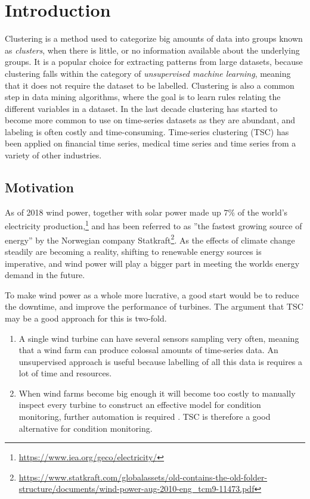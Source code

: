 \chapter{Introduction} \label{chap:intro}

Clustering is a method used to categorize big amounts of data into groups known as \textit{clusters}, when there is little, or no information available about the underlying groups. 
It is a popular choice for extracting patterns from large datasets, because clustering falls within the category of \textit{unsupervised machine learning}, meaning that it does not require the dataset to be labelled. 
Clustering is also a common step in data mining algorithms, where the goal is to learn rules relating the different variables in a dataset. 
In the last decade clustering has started to become more common to use on time-series datasets as they are abundant, and labeling is often costly and time-consuming. 
Time-series clustering (TSC) has been applied on financial time series, medical time series and time series from a variety of other industries. \bigskip

\section{Motivation}

As of 2018 wind power, together with solar power made up $7\%$ of the world's electricity production,\footnote{\url{https://www.iea.org/geco/electricity/}} and has been referred to as ''the fastest growing source of energy'' by the Norwegian company Statkraft\footnote{\url{https://www.statkraft.com/globalassets/old-contains-the-old-folder-structure/documents/wind-power-aug-2010-eng_tcm9-11473.pdf}}. 
As the effects of climate change steadily are becoming a reality, shifting to renewable energy sources is imperative, and wind power will play a bigger part in meeting the worlds energy demand in the future. \bigskip

To make wind power as a whole more lucrative, a good start would be to reduce the downtime, and improve the performance of turbines. The argument that TSC may be a good approach for this is two-fold. 

\begin{enumerate}
    \item A single wind turbine can have several sensors sampling very often, meaning that a wind farm can produce colossal amounts of time-series data. An unsupervised approach is useful because labelling of all this data is requires a lot of time and resources.
    \item When wind farms become big enough it will become too costly to manually inspect every turbine to construct an effective model for condition monitoring, further automation is required \cite{espen}. TSC is therefore a good alternative for condition monitoring.
\end{enumerate}

